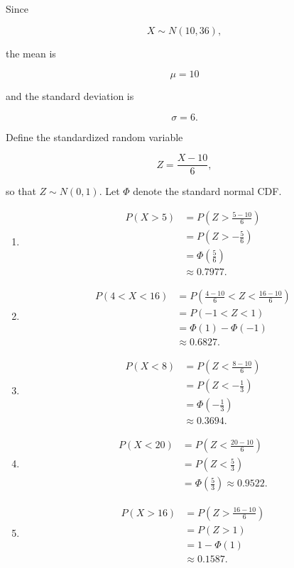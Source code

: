 \documentclass[11pt]{article}
\newenvironment{solution}{
    \par
    \begin{tcolorbox}[
        colback=white,
        colframe=uwgold,
        boxrule=0.7pt,
        arc=2mm,
        left=3mm,
        right=3mm,
        top=2mm,
        bottom=2mm,
        breakable,
        before skip=0.5em,
        after skip=1em,
        title=\textbf{Solution},
        coltitle=uwpurple,
        fonttitle=\bfseries
    ]
}{
    \end{tcolorbox}
}
\begin{document}
\begin{solution}

Since

\[
X\sim N(10,36),
\]

the mean is

\[
\mu=10
\]

and the standard deviation is

\[
\sigma=6.
\]

Define the standardized random variable

\[
Z=\frac{X-10}{6},
\]

so that \(Z\sim N(0,1)\). Let \(\Phi\) denote the standard normal CDF.

\begin{enumerate}[label=(\alph*)]

\item

\begin{align*}
P(X>5)
&=
P\left(
Z>\frac{5-10}{6}
\right)\\
&=
P\left(Z>-\frac56\right)\\
&=
\Phi\left(\frac56\right)\\
&\approx
 {0.7977}.
\end{align*}

\item

\begin{align*}
P(4<X<16)
&=
P\left(
\frac{4-10}{6}<Z<
\frac{16-10}{6}
\right)\\
&=
P(-1<Z<1)\\
&=
\Phi(1)-\Phi(-1)\\
&\approx
 {0.6827}.
\end{align*}

\item

\begin{align*}
P(X<8)
&=
P\left(
Z<\frac{8-10}{6}
\right)\\
&=
P\left(Z<-\frac13\right)\\
&=
\Phi\left(-\frac13\right)\\
&\approx
 {0.3694}.
\end{align*}

\item

\begin{align*}
P(X<20)
&=
P\left(
Z<\frac{20-10}{6}
\right)\\
&=
P\left(Z<\frac53\right)\\
&=
\Phi\left(\frac53\right) \approx  {0.9522}.
\end{align*}

\item

\begin{align*}
P(X>16)
&=
P\left(
Z>\frac{16-10}{6}
\right)\\
&=
P(Z>1)\\
&=
1-\Phi(1)\\
&\approx
 {0.1587}.
\end{align*}

\end{enumerate}

\end{solution}
 
\end{document}
